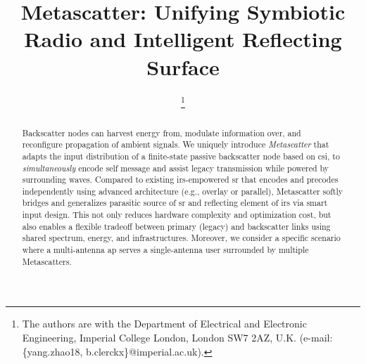 \documentclass[journal]{IEEEtran}
\begin{document}
\title{Metascatter: Unifying Symbiotic Radio and Intelligent Reflecting Surface}
\author{
	\thanks{
		The authors are with the Department of Electrical and Electronic Engineering, Imperial College London, London SW7 2AZ, U.K. (e-mail: \{yang.zhao18, b.clerckx\}@imperial.ac.uk).
	}
}
\maketitle

\begin{abstract}
	Backscatter nodes can harvest energy from, modulate information over, and reconfigure propagation of ambient signals.
	We uniquely introduce \emph{Metascatter} that adapts the input distribution of a finite-state passive backscatter node based on \gls{csi}, to \emph{simultaneously} encode self message and assist legacy transmission while powered by surrounding waves.
	Compared to existing \gls{irs}-empowered \gls{sr} that encodes and precodes independently using advanced architecture (e.g., overlay or parallel), Metascatter softly bridges and generalizes parasitic source of \gls{sr} and reflecting element of \gls{irs} via smart input design.
	This not only reduces hardware complexity and optimization cost, but also enables a flexible tradeoff between primary (legacy) and backscatter links using shared spectrum, energy, and infrastructures.
	Moreover, we consider a specific scenario where a multi-antenna \gls{ap} serves a single-antenna user surrounded by multiple Metascatters.

\end{abstract}
\end{document}
